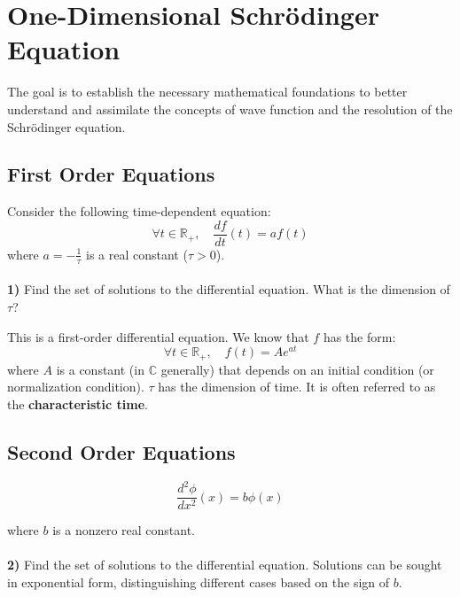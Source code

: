 \section{One-Dimensional Schrödinger Equation}

\noindent The goal is to establish the necessary mathematical foundations to better understand and assimilate the concepts of wave function and the resolution of the Schrödinger equation.

\subsection{First Order Equations}
\noindent Consider the following time-dependent equation:
\begin{equation}
    \forall t \in \mathbb{R}_{+}, \quad \frac{df}{dt}(t) = af(t)
\end{equation}
where $\displaystyle a=-\frac{1}{\tau}$ is a real constant ($\tau >0$).\\ \\

\noindent \textbf{1)} Find the set of solutions to the differential equation. What is the dimension of $\tau$?\\

\begin{breakbox}
\noindent This is a first-order differential equation. We know that $f$ has the form: $$\boxed{\forall t \in \mathbb{R}_{+}, \quad f(t)=Ae^{at}}$$ 
where $A$ is a constant (in $\mathbb{C}$ generally) that depends on an initial condition (or normalization condition). $\tau$ has the dimension of time. It is often referred to as the \textbf{characteristic time}.
\end{breakbox}

\subsection{Second Order Equations}

\begin{equation}
    \frac{d^2\phi}{dx^2}(x) = b\phi(x)
    \label{equ2}
\end{equation}

\noindent
where $b$ is a nonzero real constant.\\ \\

\noindent \textbf{2)} Find the set of solutions to the differential equation. Solutions can be sought in exponential form, distinguishing different cases based on the sign of $b$.\\

